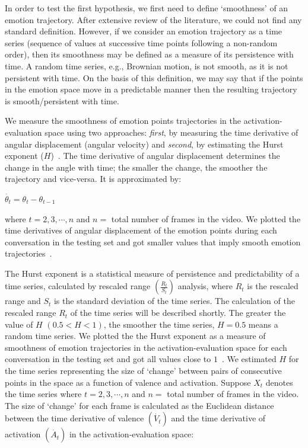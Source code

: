 \documentclass[10pt,journal,cspaper,compsoc]{IEEEtran}
\begin{document}
In order to test the first hypothesis,  we first need to define `smoothness' of an emotion trajectory. After extensive review of the literature, we could not find any standard definition. However, if we consider an emotion trajectory as a time series (sequence of values at successive time points following a non-random order), then its smoothness may be defined as a measure of its persistence with time. A random time series, e.g., Brownian motion, is not smooth, as it is not persistent with time. On the basis of this definition, we may say that if the points in the emotion space move in a predictable manner then the resulting trajectory is smooth/persistent with time.

We measure the smoothness of emotion points trajectories in the activation-evaluation space using two approaches: \emph{first}, by measuring the time derivative of angular displacement (angular velocity) and \emph{second}, by estimating the Hurst exponent ($H$)~\cite{qian2004hurst}. The time derivative of angular displacement determines the change in the angle with time; the smaller the change, the smoother the trajectory and vice-versa. It is approximated by:

\begin{center}
$\dot{\theta_{t}}=\theta_{t}-\theta_{t-1}$  \\
\end{center}

\noindent where $t=2,3,\cdots,n$ and $n=$ total number of frames in the video. We plotted the time derivatives of angular displacement of the emotion points during each conversation in the testing set and got smaller values that imply smooth emotion trajectories~\cite{ayesha hakim analysis paper}.

The Hurst exponent is a statistical measure of persistence and predictability of a time series, calculated by rescaled range $\left(\frac{R_{t}}{S_{t}}\right)$ analysis, where $R_{t}$ is the rescaled range and $S_{t}$ is the standard deviation of the time series. The calculation of the rescaled range $R_{t}$ of the time series will be described shortly. The greater the value of $H$ $(0.5<H<1)$, the smoother the time series, $H=0.5$ means a random time series. We plotted the the Hurst exponent as a measure of smoothness of emotion trajectories in the activation-evaluation space for each conversation in the testing set and got all values close to $1$~\cite{ayesha hakim analysis paper}. We estimated $H$ for the time series representing the size of `change' between pairs of consecutive points in the space as a function of valence and activation. Suppose $X_{t}$ denotes the time series where $t=2,3,\cdots,n$ and $n=$ total number of frames in the video. The size of `change' for each frame is calculated as the Euclidean distance between the time derivative of valence $(\dot{V_{t}})$ and the time derivative of activation $(\dot{A_{t}})$ in the activation-evaluation space:
\end{document}
